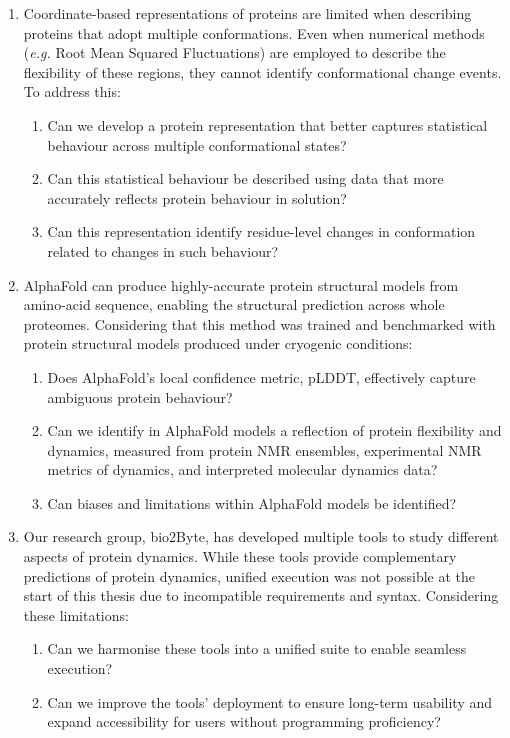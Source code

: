 \begin{enumerate}
    \item Coordinate-based representations of proteins are limited when describing proteins that adopt multiple conformations. Even when numerical methods (\textit{e.g.} Root Mean Squared Fluctuations) are employed to describe the flexibility of these regions, they cannot identify conformational change events. To address this: 
    \begin{enumerate}
        \item Can we develop a protein representation that better captures statistical behaviour across multiple conformational states?
        \item Can this statistical behaviour be described using data that more accurately reflects protein behaviour in solution?
        \item Can this representation identify residue-level changes in conformation related to changes in such behaviour?
    \end{enumerate}
    
    \item AlphaFold can produce highly-accurate protein structural models from amino-acid sequence, enabling the structural prediction across whole proteomes. Considering that this method was trained and benchmarked with protein structural models produced under cryogenic conditions: 
    \begin{enumerate}
        \item Does AlphaFold's local confidence metric, pLDDT, effectively capture ambiguous protein behaviour?
        \item Can we identify in AlphaFold models a reflection of protein flexibility and dynamics, measured from protein NMR ensembles, experimental NMR metrics of dynamics, and interpreted molecular dynamics data?
        \item Can biases and limitations within AlphaFold models be identified?
    \end{enumerate}

    \item Our research group, bio2Byte, has developed multiple tools to study different aspects of protein dynamics. While these tools provide complementary predictions of protein dynamics, unified execution was not possible at the start of this thesis due to incompatible requirements and syntax. Considering these limitations: 
    \begin{enumerate}
        \item Can we harmonise these tools into a unified suite to enable seamless execution?
        \item Can we improve the tools' deployment to ensure long-term usability and expand accessibility for users without programming proficiency?
    \end{enumerate}
\end{enumerate}



